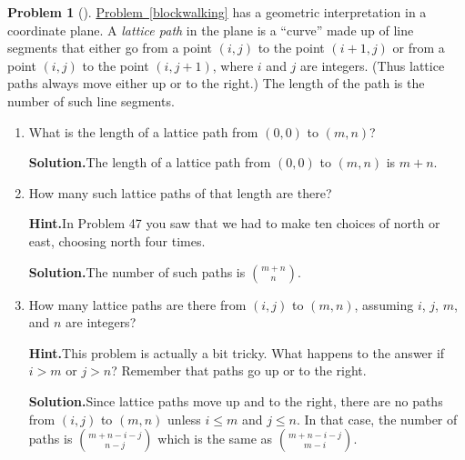 \documentclass[10pt,]{book}
\theoremstyle{plain}
\theoremstyle{definition}
\newtheorem{activity}[project]{Problem}
\theoremstyle{definition}
\numberwithin{equation}{chapter}
\newcommand{\gt}{>}
\begin{document}
\begin{activity}[]\label{latticepaths}
\hyperref[blockwalking]{Problem~\ref{blockwalking}} has a geometric interpretation in a coordinate plane. A \emph{lattice path} in the plane is a ``curve'' made up of line segments that either go from a point \((i,j)\) to the point \((i+1,j)\) or from a point \((i,j)\) to the point \((i,j+1)\), where \(i\) and \(j\) are integers. (Thus lattice paths always move either up or to the right.) The length of the path is the number of such line segments.%
\begin{enumerate}[font=\bfseries,label=(\alph*),ref=\alph*]
\item\label{task-43} What is the length of a lattice path from \((0,0)\) to \((m,n)\)?%
\par\medskip\noindent%
\textbf{Solution.}\quad The length of a lattice path from \((0,0)\) to \((m,n)\) is \(m+n\).%
\item\label{task-44} How many such lattice paths of that length are there?%
\par\medskip\noindent%
\textbf{Hint.}\quad In Problem 47 you saw that we had to make ten choices of north or east, choosing north four times.%
\par\medskip\noindent%
\textbf{Solution.}\quad The number of such paths is \(\binom{m+n}{n}\).%
\item\label{task-45} How many lattice paths are there from \((i,j)\) to \((m,n)\), assuming \(i\), \(j\), \(m\), and \(n\) are integers?%
\par\medskip\noindent%
\textbf{Hint.}\quad This problem is actually a bit tricky. What happens to the answer if \(i \gt m\) or \(j \gt n\)? Remember that paths go up or to the right.%
\par\medskip\noindent%
\textbf{Solution.}\quad Since lattice paths move up and to the right, there are no paths from \((i,j)\) to \((m,n)\) unless \(i\le m\) and \(j\le n\). In that case, the number of paths is \(\binom{m+n-i-j}{n-j}\) which is the same as \(\binom{m+n-i-j}{m-i}\).%
\end{enumerate}
\end{activity}
\end{document}
